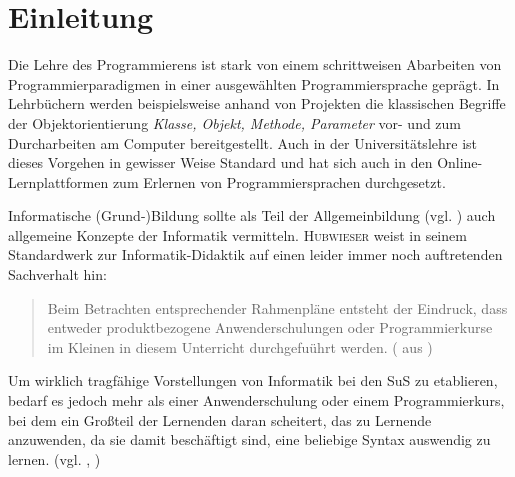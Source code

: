 \documentclass[paper=a4, DIV=13, BCOR=12mm, twoside=on, onecolumn=on, open = any, titlepage =on, parskip =half-, headsepline = on, footsepline = on, chapterprefix = on, sectionprefix = on, appendixprefix = off, fontsize = 11pt, numbers = noenddot, abstract = off]{scrreprt}
\begin{document}
\newpage
\thispagestyle{plain}




\thispagestyle{empty}
\newpage
\thispagestyle{empty}

%
%
{}
\newcommand{\hsp}{\hspace{20pt}}
\titleformat{\chapter}[hang]{\Large\bfseries}{\thechapter\hsp\textcolor{gray75}{|}\hsp}{0pt}{\Large\bfseries}

\tableofcontents
\cleardoublepage
{}
\par \singlespacing
\renewcommand*{\dictumwidth}{.6667\textwidth}
\chapter{Einleitung}
\label{sec:einleitung}
\onehalfspacing


Die Lehre des Programmierens ist stark von einem schrittweisen Abarbeiten von Programmierparadigmen in einer ausgewählten Programmiersprache geprägt. In Lehrbüchern werden beispielsweise anhand von Projekten die klassischen Begriffe der Objektorientierung \emph{Klasse, Objekt, Methode, Parameter} vor- und zum Durcharbeiten am Computer bereitgestellt. Auch in der Universitätslehre ist dieses Vorgehen in gewisser Weise Standard und hat sich auch in den Online-Lernplattformen zum Erlernen von Programmiersprachen durchgesetzt. 

Informatische (Grund-)Bildung sollte als Teil der Allgemeinbildung (vgl. \cite{breier:94}) auch allgemeine Konzepte der Informatik vermitteln. \textsc{Hubwieser} weist in seinem Standardwerk zur Informatik-Didaktik auf einen leider immer noch auftretenden Sachverhalt hin:
\begin{quote}
Beim Betrachten entsprechender Rahmenpläne entsteht der Eindruck, dass entweder produktbezogene Anwenderschulungen oder Programmierkurse im Kleinen in diesem Unterricht durchgefuührt werden. (\cite[S.40]{hubwieser:07} aus \cite{koerber:93})
\end{quote}
Um wirklich tragfähige Vorstellungen von Informatik bei den SuS zu etablieren, bedarf es jedoch mehr als einer Anwenderschulung oder einem Programmierkurs, bei dem ein Großteil der Lernenden daran scheitert,  das zu Lernende anzuwenden, da sie damit beschäftigt sind, eine beliebige Syntax auswendig zu lernen. (vgl. \cite{humbert:02}, \cite{modrow:11})
\end{document}
